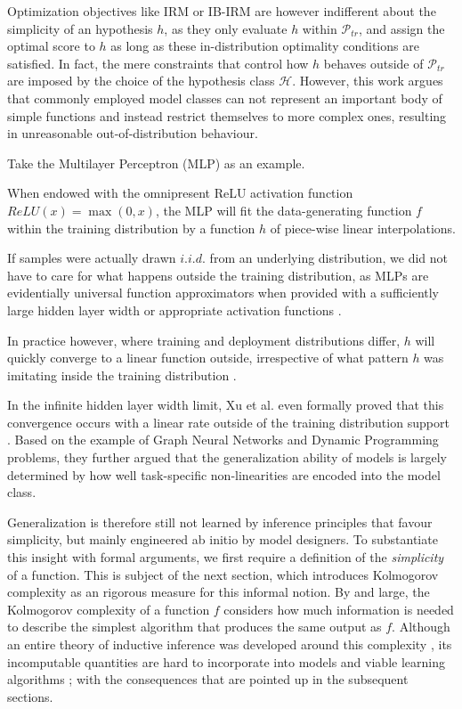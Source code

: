 Optimization objectives like IRM or IB-IRM are however indifferent about the simplicity of an hypothesis $h$, as they only evaluate $h$ within $\mathcal{P}_{tr}$, and assign the optimal score to $h$ as long as these in-distribution optimality conditions are satisfied.
In fact, the mere constraints that control how $h$ behaves outside of $\mathcal{P}_{tr}$ are imposed by the choice of the hypothesis class $\mathcal{H}$.
However, this work argues that commonly employed model classes can not represent an important body of simple functions and instead restrict themselves to more complex ones, resulting in unreasonable out-of-distribution behaviour.

Take the Multilayer Perceptron (MLP) \cite{rosenblatt1962principles} as an example.

When endowed with the omnipresent ReLU activation function $ReLU(x)=\max(0,x)$, the MLP will fit the data-generating function $f$ within the training distribution by a function $h$ of piece-wise linear interpolations.

If samples were actually drawn $i.i.d.$ from an underlying distribution, we did not have to care for what happens outside the training distribution, as MLPs are evidentially universal function approximators when provided with a sufficiently large hidden layer width or appropriate activation functions \cite{hornik1989multilayer} \cite{LESHNO1993861}.

In practice however, where training and deployment distributions differ, $h$ will quickly converge to a linear function outside, irrespective of what pattern $h$ was imitating inside the training distribution \cite{haley1992extrapolation}.

In the infinite hidden layer width limit, Xu et al. even formally proved that this convergence occurs with a linear rate outside of the training distribution support \cite{xu2019can}.
Based on the example of Graph Neural Networks and Dynamic Programming problems, they further argued that the generalization ability of models is largely determined by how well task-specific non-linearities are encoded into the model class.

Generalization is therefore still not learned by inference principles that favour simplicity, but mainly engineered ab initio by model designers.
To substantiate this insight with formal arguments, we first require a definition of the \textit{simplicity} of a function.
This is subject of the next section, which introduces Kolmogorov complexity as an rigorous measure for this informal notion.
By and large, the Kolmogorov complexity of a function $f$ considers how much information is needed to describe the simplest algorithm that produces the same output as $f$.
Although an entire theory of inductive inference was developed around this complexity \cite{solomonoff1964formal}, its incomputable quantities are hard to incorporate into models and viable learning algorithms \cite{levin1973universal}; with the consequences that are pointed up in the subsequent sections.

